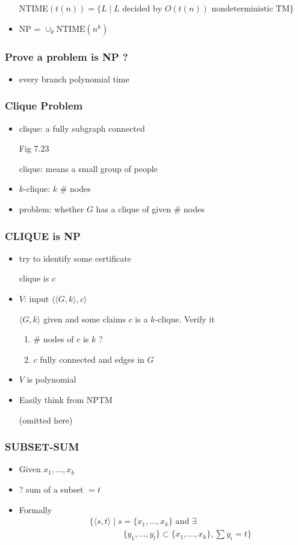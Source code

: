\begin{frame}[allowframebreaks]
\begin{itemize}
NTIME$(t(n)) = \{L\mid L
\text{ decided by } O(t(n))
\text{ nondeterministic TM}\}$
\item NP = $\cup_k \text{NTIME}(n^k)$

\end{itemize}\end{frame} \begin{frame}[allowframebreaks] \frametitle{Prove a problem is NP ?}
  \begin{itemize}
\item every branch polynomial time
\end{itemize}\end{frame} \begin{frame}[allowframebreaks] \frametitle{Clique Problem}
  \begin{itemize}
\item clique: a fully subgraph connected

Fig 7.23

clique: means a small group of people

\item $k$-clique: $k$ \# nodes
\item problem: whether $G$ has a clique of given \# nodes
\end{itemize}\end{frame} \begin{frame}[allowframebreaks] \frametitle{CLIQUE is NP}
  \begin{itemize}
\item try to identify some certificate

clique is $c$
\item $V$: input $\langle  \langle  G,k\rangle ,c\rangle $

$\langle  G,k\rangle $ given and some claims $c$ is a $k$-clique. Verify it
  \begin{enumerate}
  \item \# nodes of $c$ is $k$ ?
  \item $c$ fully connected and edges in $G$
  \end{enumerate}
  \item $V$ is polynomial
  \item Easily think from NPTM

(omitted here)



\end{itemize}\end{frame} \begin{frame}[allowframebreaks] \frametitle{SUBSET-SUM}
  \begin{itemize}
\item Given $x_1, \ldots, x_k$
\item ? sum of a subset $=t$
\item Formally
  \begin{eqnarray*}
&&    \{\langle  s,t\rangle 
\mid s=\{x_1, \ldots, x_k\}
\mbox{ and }
\exists \\
&&\qquad \qquad \{y_1, \ldots, y_l\}
\subset \{x_1, \ldots, x_k\},
\sum y_i =t\}
\end{eqnarray*}


\end{itemize}
\end{frame}
